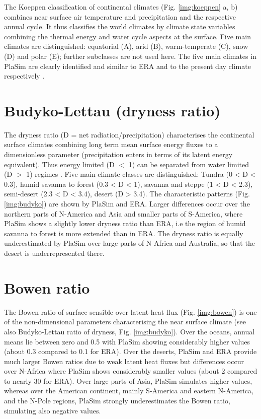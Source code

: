 \documentclass[12pt,a4paper,twoside,openright,headinclude,liststotoc,bibtotoc]{scrreprt}
\begin{document}
The Koeppen classification of continental climates (Fig. \ref{img:koeppen} a, b) combines near surface air temperature and precipitation and the respective annual cycle. It thus classifies the world climates by climate state variables combining the thermal energy and water cycle aspects at the surface. Five main climates are distinguished: equatorial (A), arid (B), warm-temperate (C), snow (D) and polar (E); further subclasses are not used here. The five main climates in PlaSim are clearly identified and similar to ERA and to the present day climate respectively \citep{Fraedrich2001}. 

\vspace{-0.4cm}
\section{Budyko-Lettau (dryness ratio)}
\vspace{-0.4cm}

The dryness ratio (D = net radiation/precipitation) characterises the continental surface climates combining long term mean surface energy fluxes to a dimensionless parameter (precipitation enters in terms of its latent energy equivalent). Thus energy limited (D $<$ 1) can be separated from water limited (D $>$ 1) regimes \citep{Budyko1958,Budyko1974,Lettau1969}. Five main climate classes are distinguished: Tundra (0 < D < 0.3), humid savanna to forest (0.3 < D < 1), savanna and steppe (1 < D < 2.3), semi-desert (2.3 < D < 3.4), desert (D > 3.4). The characteristic patterns (Fig. \ref{img:budyko}) are shown by PlaSim and ERA. Larger differences occur over the northern parts of N-America and Asia and smaller parts of S-America, where PlaSim shows a slightly lower dryness ratio than ERA, i.e the region of humid savanna to forest is more extended than in ERA. The dryness ratio is equally underestimated by PlaSim over large parts of N-Africa and Australia, so that the desert is underrepresented there. 


\vspace{-0.4cm}
\section{Bowen ratio}
\vspace{-0.4cm}

The Bowen ratio \citep{Bowen1926a} of surface sensible over latent heat flux (Fig. \ref{img:bowen}) is one of the non-dimensional parameters characterising the near surface climate (see also Budyko-Lettau ratio of dryness, Fig. \ref{img:budyko}). Over the oceans, annual means lie between zero and 0.5 with PlaSim showing considerably higher values (about 0.3 compared to 0.1 for ERA). Over the deserts, PlaSim and ERA provide much larger Bowen ratios due to weak latent heat fluxes but differences occur over N-Africa where PlaSim shows considerably smaller values (about 2 compared to nearly 30 for ERA). Over large parts of Asia, PlaSim simulates higher values, whereas over the American continent, mainly S-America and eastern N-America, and the N-Pole regions, PlaSim strongly underestimates the Bowen ratio, simulating also negative values.
\end{document}
